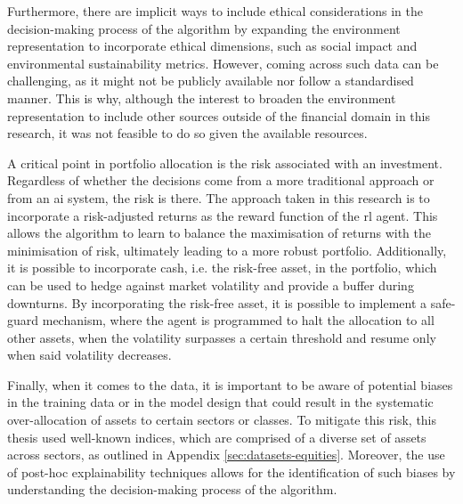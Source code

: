 Furthermore, there are implicit ways to include ethical considerations in the decision-making process of the algorithm by expanding the environment representation to incorporate ethical dimensions, such as social impact and environmental sustainability metrics. However, coming across such data can be challenging, as it might not be publicly available nor follow a standardised manner. This is why, although the interest to broaden the environment representation to include other sources outside of the financial domain in this research, it was not feasible to do so given the available resources. 

A critical point in portfolio allocation is the risk associated with an investment. Regardless of whether the decisions come from a more traditional approach or from an \acrshort{ai} system, the risk is there. The approach taken in this research is to incorporate a risk-adjusted returns as the reward function of the \acrshort{rl} agent. This allows the algorithm to learn to balance the maximisation of returns with the minimisation of risk, ultimately leading to a more robust portfolio. Additionally, it is possible to incorporate cash, i.e. the risk-free asset, in the portfolio, which can be used to hedge against market volatility and provide a buffer during downturns. By incorporating the risk-free asset, it is possible to implement a safe-guard mechanism, where the agent is programmed to halt the allocation to all other assets, when the volatility surpasses a certain threshold and resume only when said volatility decreases.

Finally, when it comes to the data, it is important to be aware of potential biases in the training data or in the model design that could result in the systematic over-allocation of assets to certain sectors or classes. To mitigate this risk, this thesis used well-known indices, which are comprised of a diverse set of assets across sectors, as outlined in Appendix \ref{sec:datasets-equities}. Moreover, the use of post-hoc explainability techniques allows for the identification of such biases by understanding the decision-making process of the algorithm. 
